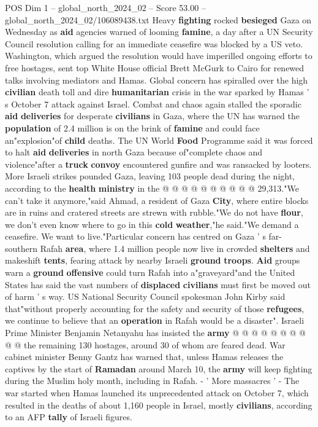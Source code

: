\begin{textsample}{POS Dim 1 – global\_north\_2024\_02 – Score 53.00 – global\_north\_2024\_02/106089438.txt}  \label{ex:f1_pos_091}
Heavy \textbf{fighting} rocked \textbf{besieged} Gaza on Wednesday as \textbf{aid} agencies warned of looming \textbf{famine}, a day after a UN Security Council resolution calling for an immediate ceasefire was blocked by a US veto.
Washington, which argued the resolution would have imperilled ongoing efforts to free hostages, sent top White House official Brett McGurk to Cairo for renewed talks involving mediators and Hamas.
Global concern has spiralled over the high \textbf{civilian} death toll and dire \textbf{humanitarian} crisis in the war sparked by Hamas ' s October 7 attack against Israel.
Combat and chaos again stalled the sporadic \textbf{aid} \textbf{deliveries} for desperate \textbf{civilians} in Gaza, where the UN has warned the \textbf{population} of 2.4 million is on the brink of \textbf{famine} and could face an"explosion"of \textbf{child} deaths.
The UN World \textbf{Food} Programme said it was forced to halt \textbf{aid} \textbf{deliveries} in north Gaza because of"complete chaos and violence"after a \textbf{truck} \textbf{convoy} encountered gunfire and was ransacked by looters.
More Israeli strikes pounded Gaza, leaving 103 people dead during the night, according to the \textbf{health} \textbf{ministry} in the @ @ @ @ @ @ @ @ @ @ 29,313."We can't take it anymore,"said Ahmad, a resident of Gaza \textbf{City}, where entire blocks are in ruins and cratered streets are strewn with rubble."We do not have \textbf{flour}, we don't even know where to go in this \textbf{cold} \textbf{weather},"he said."We demand a ceasefire.
We want to live."Particular concern has centred on Gaza ' s far-southern Rafah \textbf{area}, where 1.4 million people now live in crowded \textbf{shelters} and makeshift \textbf{tents}, fearing attack by nearby Israeli \textbf{ground} \textbf{troops}. \textbf{Aid} groups warn a \textbf{ground} \textbf{offensive} could turn Rafah into a"graveyard"and the United States has said the vast numbers of \textbf{displaced} \textbf{civilians} must first be moved out of harm ' s way.
US National Security Council spokesman John Kirby said that"without properly accounting for the safety and security of those \textbf{refugees}, we continue to believe that an \textbf{operation} in Rafah would be a disaster".
Israeli Prime Minister Benjamin Netanyahu has insisted the \textbf{army} @ @ @ @ @ @ @ @ @ @ the remaining 130 hostages, around 30 of whom are feared dead.
War cabinet minister Benny Gantz has warned that, unless Hamas releases the captives by the start of \textbf{Ramadan} around March 10, the \textbf{army} will keep fighting during the Muslim holy month, including in Rafah. - ' More massacres ' - The war started when Hamas launched its unprecedented attack on October 7, which resulted in the deaths of about 1,160 people in Israel, mostly \textbf{civilians}, according to an AFP \textbf{tally} of Israeli figures.

\end{textsample}
